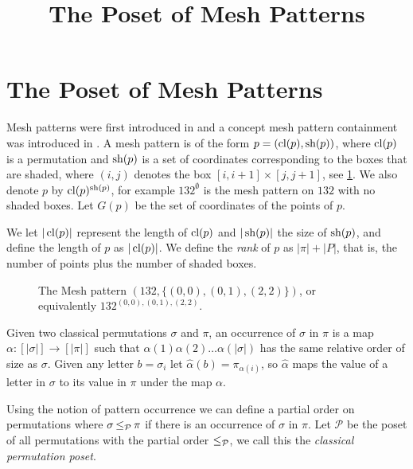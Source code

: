 \documentclass[11pt,a4paper,oneside]{article}
\title{The Poset of Mesh Patterns}
\begin{document}
	\maketitle


\section{The Poset of Mesh Patterns}

Mesh patterns were first introduced in \cite{Bra11} and a concept mesh pattern containment was introduced in \cite{TU17}. A mesh pattern is of the form $p=(\operatorname{\textrm{cl}}(p),\operatorname{\textrm{sh}}(p))$, where $\operatorname{\textrm{cl}}(p)$ is a permutation and $\operatorname{\textrm{sh}}(p)$ is a set of coordinates corresponding to the boxes that are shaded, where $(i,j)$ denotes the box $[i,i+1]\times[j,j+1]$, see \cref{fig:132}. We also denote $p$ by $\operatorname{\textrm{cl}}(p)^{\operatorname{\textrm{sh}}(p)}$, for example $132^\emptyset$ is the mesh pattern on $132$ with no shaded boxes. Let $G(p)$ be the set of coordinates of the points of $p$.

We let $|\operatorname{\textrm{cl}}(p)|$ represent the length of $\operatorname{\textrm{cl}}(p)$ and $|\operatorname{\textrm{sh}}(p)|$ the size of $\operatorname{\textrm{sh}}(p)$, and define the length of $p$ as $|\operatorname{\textrm{cl}}(p)|$. We define the \emph{rank} of $p$ as $|\pi|+|P|$, that is, the number of points plus the number of shaded boxes.


\begin{figure}\centering{}
\caption{The Mesh pattern $(132,\{(0,0),(0,1),(2,2)\})$, or equivalently $132^{(0,0),(0,1),(2,2)}$.}\label{fig:132}\end{figure}

Given two classical permutations $\sigma$ and $\pi$, an occurrence of $\sigma$ in $\pi$ is a map $\alpha:[|\sigma|]\rightarrow[|\pi|]$ such that $\alpha(1)\alpha(2)\ldots\alpha(|\sigma|)$ has the same relative order of size as $\sigma$. Given any letter $b=\sigma_i$ let $\hat{\alpha}(b)=\pi_{\alpha(i)}$, so $\hat{\alpha}$ maps the value of a letter in $\sigma$ to its value in $\pi$ under the map $\alpha$.

Using the notion of pattern occurrence we can define a partial order on permutations where $\sigma\operatorname{\le_{\mathcal{P}}}\pi$ if there is an occurrence of $\sigma$ in $\pi$. Let $\mathcal{P}$ be the poset of all permutations with the partial order $\operatorname{\le_{\mathcal{P}}}$, we call this the \emph{classical permutation poset}.
\end{document}
